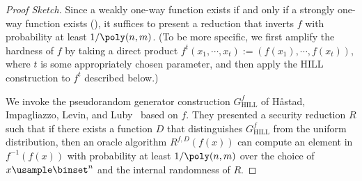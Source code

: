 \documentclass[11pt]{article}
\numberwithin{equation}{section}
\theoremstyle{definition}
\theoremstyle{plain}
\begin{document}
\begin{proof}
  [Proof Sketch]
  Since a weakly one-way function exists if and only if a strongly one-way function exists (\cite{Yao82a_focs_conf}),
  it suffices to present a reduction that inverts $f$ with probability at least $1  / \poly(n, m)$.
  (To be more specific,
  we first amplify the hardness of $f$ by taking a direct product
  $f^t(x_1, \cdots, x_t) := (f(x_1), \cdots, f(x_t))$,
  where $t$ is some appropriately chosen parameter, and
  then apply the HILL construction to $f^t$ described below.)

  We invoke the pseudorandom generator construction $G_\mathrm{HILL}^{f}$ of
  H{\aa}stad, Impagliazzo, Levin, and Luby~\cite{HastadILL99_siamcomp_journals}
  based on $f$.
  They presented a security reduction $R$
  such
  that
  if there exists a function $D$ that distinguishes $G_\mathrm{HILL}^{f}$ from
  the uniform distribution,
  then an oracle algorithm $R^{f, D}(f({x}))$ can compute an element in $f^{-1}(f({x}))$
  with probability at least $1 / \poly(n, m)$ over the choice of $x \usample \binset^{n}$ and the
  internal randomness of $R$.
\end{proof}
\end{document}
